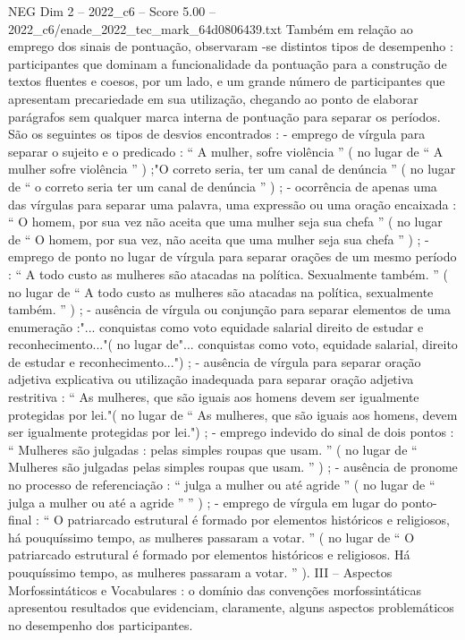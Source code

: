 \begin{textsample}{NEG Dim 2 – 2022\_c6 – Score 5.00 – 2022\_c6/enade\_2022\_tec\_mark\_64d0806439.txt}
Também em relação ao emprego dos sinais de pontuação, observaram -se distintos tipos de desempenho : participantes que dominam a funcionalidade da pontuação para a construção de textos fluentes e coesos, por um lado, e um grande número de participantes que apresentam precariedade em sua utilização, chegando ao ponto de elaborar parágrafos sem qualquer marca interna de pontuação para separar os períodos.
São os seguintes os tipos de desvios encontrados : - emprego de vírgula para separar o sujeito e o predicado : “ A mulher, sofre violência ” ( no lugar de “ A mulher sofre violência ” ) ;"O correto seria, ter um canal de denúncia ” ( no lugar de “ o correto seria ter um canal de denúncia ” ) ; - ocorrência de apenas uma das vírgulas para separar uma palavra, uma expressão ou uma oração encaixada : “ O homem, por sua vez não aceita que uma mulher seja sua chefa ” ( no lugar de “ O homem, por sua vez, não aceita que uma mulher seja sua chefa ” ) ; - emprego de ponto no lugar de vírgula para separar orações de um mesmo período : “ A todo custo as mulheres são atacadas na política.
Sexualmente também. ” ( no lugar de “ A todo custo as mulheres são atacadas na política, sexualmente também. ” ) ; - ausência de vírgula ou conjunção para separar elementos de uma enumeração :"... conquistas como voto equidade salarial direito de estudar e reconhecimento..."( no lugar de"... conquistas como voto, equidade salarial, direito de estudar e reconhecimento...") ; - ausência de vírgula para separar oração adjetiva explicativa ou utilização inadequada para separar oração adjetiva restritiva : “ As mulheres, que são iguais aos homens devem ser igualmente protegidas por lei."( no lugar de “ As mulheres, que são iguais aos homens, devem ser igualmente protegidas por lei.") ; - emprego indevido do sinal de dois pontos : “ Mulheres são julgadas : pelas simples roupas que usam. ” ( no lugar de “ Mulheres são julgadas pelas simples roupas que usam. ” ) ; - ausência de pronome no processo de referenciação : “ julga a mulher ou até agride ” ( no lugar de “ julga a mulher ou até a agride ” ” ) ; - emprego de vírgula em lugar do ponto-final : “ O patriarcado estrutural é formado por elementos históricos e religiosos, há pouquíssimo tempo, as mulheres passaram a votar. ” ( no lugar de “ O patriarcado estrutural é formado por elementos históricos e religiosos.
Há pouquíssimo tempo, as mulheres passaram a votar. ” ).
III – Aspectos Morfossintáticos e Vocabulares : o domínio das convenções morfossintáticas apresentou resultados que evidenciam, claramente, alguns aspectos problemáticos no desempenho dos participantes.

\end{textsample}
